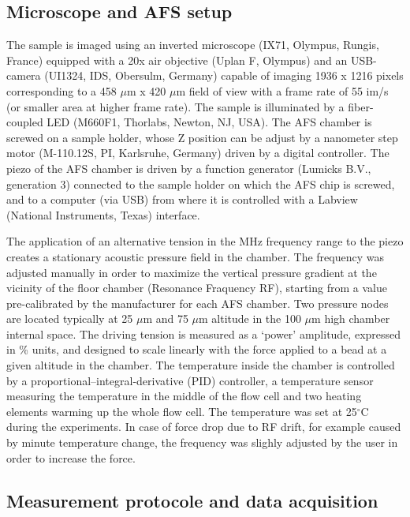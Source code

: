 \documentclass{biophys-new}
\begin{document}
\subsection*{Microscope and AFS setup}

The sample is imaged using an inverted microscope (IX71, Olympus, Rungis, France) equipped with a 20x air objective (Uplan F, Olympus) and an USB-camera (UI1324, IDS, Obersulm, Germany) capable of imaging 1936 x 1216 pixels corresponding to a 458 $\mu$m x 420 $\mu$m field of view with a frame rate of 55 im/s (or smaller area at higher frame rate). The sample is illuminated by a fiber-coupled LED (M660F1, Thorlabs, Newton, NJ, USA).
The AFS chamber is screwed on a sample holder, whose Z position can be adjust by a nanometer step motor (M-110.12S, PI, Karlsruhe, Germany) driven by a digital controller.
The piezo of the AFS chamber is driven by a function generator (Lumicks B.V., generation 3) connected to the sample holder on which the AFS chip is screwed, and to a computer (via USB) from where it is controlled with a Labview (National Instruments, Texas) interface.

The application of an alternative tension in the MHz frequency range to the piezo creates a stationary acoustic pressure field in the chamber. The frequency was adjusted manually in order to maximize the vertical pressure gradient at the vicinity of the floor chamber (Resonance Fraquency RF), starting from a value pre-calibrated by the manufacturer for each AFS chamber. Two pressure nodes are located typically at 25 $\mu$m and 75 $\mu$m altitude in the 100 $\mu$m high chamber internal space. The driving tension is measured as a ‘power’ amplitude, expressed in \% units, and designed to scale linearly with the force applied to a bead at a given altitude in the chamber. The temperature inside the chamber is controlled by a proportional–integral-derivative  (PID)  controller, a temperature sensor measuring the  temperature  in  the  middle  of  the  flow  cell and two  heating  elements warming up the whole flow cell. The temperature was set at 25$^{\circ}$C during the experiments. In case of force drop due to RF drift, for example caused by minute temperature change, the frequency was slighly adjusted by the user in order to increase the force.

\subsection*{Measurement protocole and data acquisition}
\end{document}
